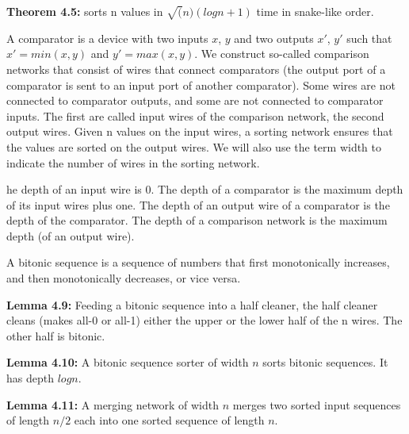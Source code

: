 {
	\begin{items}
		\item {\bf Theorem 4.5:} sorts n values in $\sqrt(n)(log n + 1)$ time in
		snake-like order.
	\end{items}
}

{
	A comparator is a device with two inputs $x$, $y$ and two outputs $x'$, $y'$
	such that $x' = min(x,y)$ and $y' = max(x,y)$. We construct so-called
	comparison networks that consist of wires that connect  comparators (the
	output port of a comparator is sent to an input port of another comparator).
	Some wires are not connected to comparator outputs, and some are not connected
	to comparator inputs. The first are called input wires of the comparison
	network, the second output wires. Given n values on the input wires, a sorting
	network ensures that the values are sorted on the output wires. We will also
	use the term width to indicate the number of wires in the sorting network. 
}

{
	he depth of an input wire is $0$. The depth of a comparator is the maximum
	depth of its input wires plus one. The depth of an output wire of a comparator
	is the depth of the comparator. The depth of a comparison network is the
	maximum depth (of an output wire). 
}

{
	A bitonic sequence is a sequence of numbers that first monotonically
	increases, and then monotonically decreases, or vice versa.
}

{
	\begin{items}
		\item {\bf Lemma 4.9:} Feeding a bitonic sequence into a half cleaner, the
		half cleaner cleans (makes all-0 or all-1) either the upper or the lower half
		of the n wires. The other half is bitonic.
	\end{items}
}

{
	\begin{items}
		\item {\bf Lemma 4.10:} A bitonic sequence sorter of width $n$
		sorts bitonic sequences. It has depth $log n$.
	\end{items}
}

{
	\begin{items}
		\item {\bf Lemma 4.11:} A merging network of width $n$ merges two
		sorted input sequences of length $n/2$ each into one sorted sequence of
		length $n$.
	\end{items}
}

